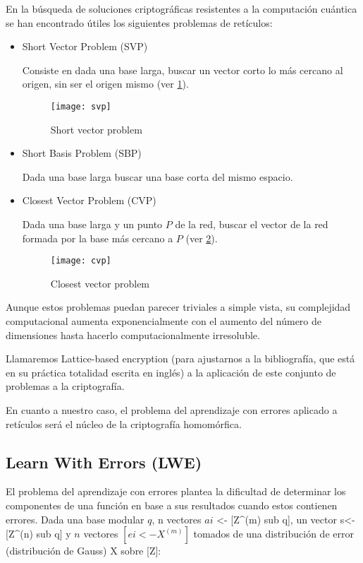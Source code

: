 En la búsqueda de soluciones criptográficas resistentes a la computación cuántica se han encontrado útiles los siguientes problemas de retículos:

\begin{itemize}
  \item Short Vector Problem (SVP)

  Consiste en dada una base larga, buscar un vector corto lo más cercano al origen, sin ser el origen mismo (ver \ref{fig:svp}).

  \begin{figure}[h]
    \caption{Short vector problem \cite{noauthor_lattice_2019}}
    \label{fig:svp}
    \texttt{[image: svp]}
  \end{figure}

  \item Short Basis Problem (SBP)

  Dada una base larga buscar una base corta del mismo espacio.

  \item Closest Vector Problem (CVP)

  Dada una base larga y un punto $P$ de la red, buscar el vector de la red formada por la base más cercano a $P$ (ver \ref{fig:cvp}).

  \begin{figure}[h]
    \caption{Closest vector problem \cite{noauthor_lattice_2019}}
    \label{fig:cvp}
    \texttt{[image: cvp]}
  \end{figure}


\end{itemize}

Aunque estos problemas puedan parecer triviales a simple vista, su complejidad computacional aumenta exponencialmente con el aumento del número de dimensiones hasta hacerlo computacionalmente irresoluble.

Llamaremos Lattice-based encryption (para ajustarnos a la bibliografía, que está en su práctica totalidad escrita en inglés) a la aplicación de este conjunto de problemas a la criptografía.

En cuanto a nuestro caso, el problema del aprendizaje con errores aplicado a retículos será el núcleo de la criptografía homomórfica.

\subsection{Learn With Errors (LWE)}

El problema del aprendizaje con errores plantea la dificultad de determinar los componentes de una función en base a sus resultados cuando estos contienen errores\cite{apon_intro_nodate}. Dada una base modular $q$, n vectores $ai$ <- [Z^(m) sub q], un vector s<- [Z^(n) sub q] y $n$ vectores $[ei <- X^(m)]$ tomados de una distribución de error (distribución de Gauss\cite{noauthor_generalized_2019}) X sobre [Z]:

